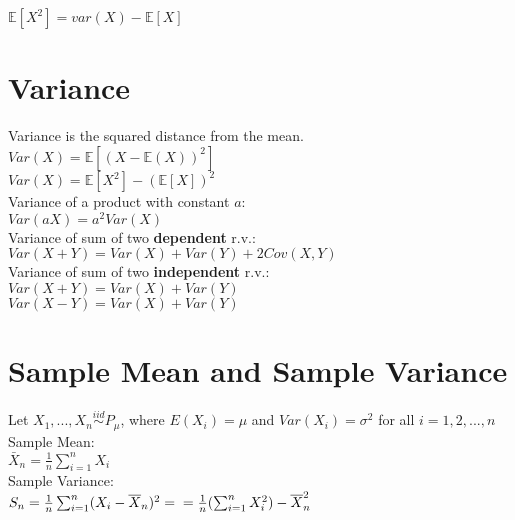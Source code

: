 $\mathbb{E}[X^2] = var(X) - \mathbb{E}[X]$\\


\section{Variance}

Variance is the squared distance from the mean.\\

$Var(X)=\mathbb{E}[(X-\mathbb{E}(X))^2]$\\

$Var\left(X\right)=\mathbb{E}\left[X^2\right]-\left(\mathbb{E}\left[X\right]\right)^2$\\

Variance of a product with constant $a$:\\

$Var(aX)=a^2 Var\left(X\right)$\\

Variance of sum of two \textbf{dependent} r.v.:\\

$Var(X + Y)=Var(X)+Var(Y)+2Cov(X,Y)$\\

Variance of sum of two \textbf{independent} r.v.:\\

$Var(X + Y)=Var(X)+Var(Y)$\\

$Var(X - Y)=Var(X)+Var(Y)$\\


\section{Sample Mean and Sample Variance}

Let $X_1, ..., X_n \stackrel{iid}{\sim} P_{\mu}$, where $E(X_i)=\mu$ and $Var(X_i)=\sigma^2$ for all $i=1,2,...,n$\\

Sample Mean:\\

$\bar{X}_n= \frac{1}{n} \sum_{i=1}^{n} X_i$\\

Sample Variance:\\

$S_n= \frac{1}{n} \sum_{i=1}^{n} (X_i - \bar{X}_n)^2 =\\ = \frac{1}{n} (\sum_{i=1}^{n} X_i^2) - \bar{X}_n^2$\\

